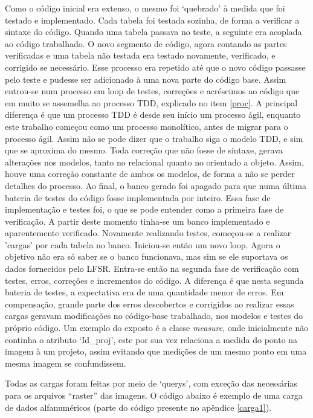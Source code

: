 Como o código inicial era extenso, o mesmo foi `quebrado' à medida que foi testado e implementado. Cada tabela foi testada sozinha, de forma a verificar a sintaxe do código. Quando uma tabela passava no teste, a seguinte era acoplada ao código trabalhado. O novo segmento de código, agora contando as partes verificadas e uma tabela não testada era testado novamente, verificado, e corrigido se necessário. Esse processo era repetido até que o novo código passasse pelo teste e pudesse ser adicionado à uma nova parte do código base.  Assim entrou-se num processo em loop de testes, correções e acréscimos ao código que em muito se assemelha ao processo TDD, explicado no item \ref{proc}. A principal diferença é que um processo TDD é desde seu início um processo ágil, enquanto este trabalho começou como um processo monolítico, antes de migrar para o processo ágil. Assim não se pode dizer que o trabalho siga o modelo TDD, e sim que se aproxima do mesmo. Toda correção que não fosse de sintaxe, gerava alterações nos modelos, tanto no relacional quanto no orientado a objeto. Assim, houve uma correção constante de ambos os modelos, de forma a não se perder detalhes do processo. Ao final, o banco gerado foi apagado para que numa última bateria de testes do código fosse implementada por inteiro. Essa fase de implementação e testes foi, o que se pode entender como a primeira fase de verificação. A partir deste momento tinha-se um banco implementado e aparentemente verificado. Novamente realizando testes, começou-se a realizar 'cargas' por cada tabela no banco. Iniciou-se então um novo loop. Agora o objetivo não era só saber se o banco funcionava, mas sim se ele suportava os dados fornecidos pelo LFSR. Entra-se então na segunda fase de verificação com testes, erros, correções e incrementos do código. A diferença é que nesta segunda bateria de testes, a expectativa era de uma quantidade menor de erros. Em compensação, grande parte dos erros descobertos e corrigidos ao realizar essas cargas geravam modificações no código-base trabalhado, nos modelos e testes do próprio código. Um exemplo do exposto é a classe \textit{measure}, onde inicialmente não continha o atributo `Id\_proj', este por sua vez relaciona a medida do ponto na imagem à um projeto, assim evitando que medições de um mesmo ponto em uma mesma imagem se confundissem.

Todas as cargas foram feitas por meio de `querys', com exceção das necessárias para os arquivos ``raster'' das imagens. O código abaixo é exemplo de uma carga de dados alfanuméricos (parte do código presente no apêndice \ref{carga1}).

